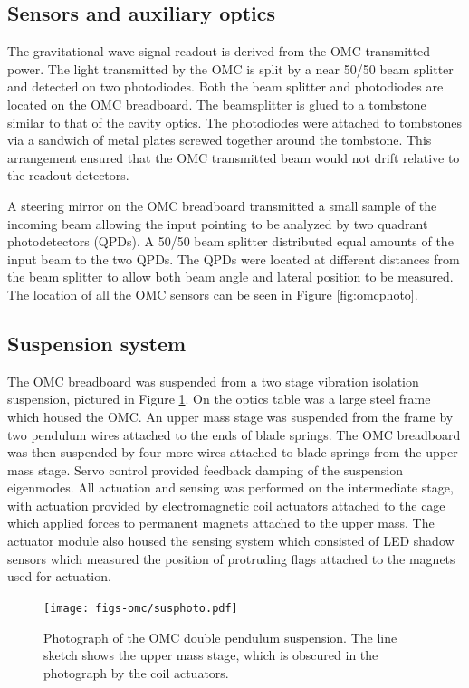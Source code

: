 \subsection{Sensors and auxiliary optics}

The gravitational wave signal readout is derived from the OMC transmitted power. %
The light transmitted by the OMC is split by a near 50/50 beam splitter and detected on two photodiodes. %
Both the beam splitter and photodiodes are located on the OMC breadboard. %
The beamsplitter is glued to a tombstone similar to that of the cavity optics. %
The photodiodes were attached to tombstones via a sandwich of metal plates screwed together around the tombstone. %
This arrangement ensured that the OMC transmitted beam would not drift relative to the readout detectors.

A steering mirror on the OMC breadboard transmitted a small sample of the incoming beam allowing the input pointing to be analyzed by two quadrant photodetectors (QPDs). %
A 50/50 beam splitter distributed equal amounts of the input beam to the two QPDs. %
The QPDs were located at different distances from the beam splitter to allow both beam angle and lateral position to be measured. %
The location of all the OMC sensors can be seen in Figure \ref{fig:omcphoto}.

\subsection{Suspension system}

The OMC breadboard was suspended from a two stage vibration isolation suspension, pictured in Figure \ref{fig:susphoto}. %
On the optics table was a large steel frame which housed the OMC. %
An upper mass stage was suspended from the frame by two pendulum wires attached to the ends of blade springs. %
The OMC breadboard was then suspended by four more wires attached to blade springs from the upper mass stage. %
Servo control provided feedback damping of the suspension eigenmodes. %
All actuation and sensing was performed on the intermediate stage, with actuation provided by electromagnetic coil actuators attached to the cage which applied forces to permanent magnets attached to the upper mass. %
The actuator module also housed the sensing system which consisted of LED shadow sensors which measured the position of protruding flags attached to the magnets used for actuation.
\begin{figure}
  \begin{center}
  \leavevmode
  \texttt{[image: figs-omc/susphoto.pdf]}
  \end{center}
  \caption[Photograph of the OMC double pendulum suspension.]{Photograph of the OMC double pendulum suspension. The line sketch shows the upper mass stage, which is obscured in the photograph by the coil actuators.}
  \label{fig:susphoto}
\end{figure}

